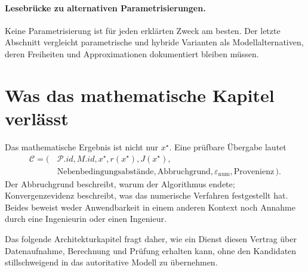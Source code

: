 \paragraph{Lesebrücke zu alternativen Parametrisierungen.}
Keine Parametrisierung ist für jeden erklärten Zweck am besten. Der letzte
Abschnitt vergleicht parametrische und hybride Varianten als Modellalternativen,
deren Freiheiten und Approximationen dokumentiert bleiben müssen.


\section*{Was das mathematische Kapitel verlässt}

Das mathematische Ergebnis ist nicht nur \(x^\star\). Eine prüfbare Übergabe
lautet
\[
\begin{aligned}
\mathcal C=(\,&\mathcal P.id,M.id,x^\star,r(x^\star),J(x^\star),\\
             &\text{Nebenbedingungsabstände},\text{Abbruchgrund},
             \varepsilon_{\mathrm{num}},\text{Provenienz}\,).
\end{aligned}
\]
Der Abbruchgrund beschreibt, warum der Algorithmus endete;
Konvergenzevidenz beschreibt, was das numerische Verfahren festgestellt hat.
Beides beweist weder Anwendbarkeit in einem anderen Kontext noch Annahme durch
eine Ingenieurin oder einen Ingenieur.

Das folgende Architekturkapitel fragt daher, wie ein Dienst diesen Vertrag
über Datenaufnahme, Berechnung und Prüfung erhalten kann, ohne den Kandidaten
stillschweigend in das autoritative Modell zu übernehmen.
